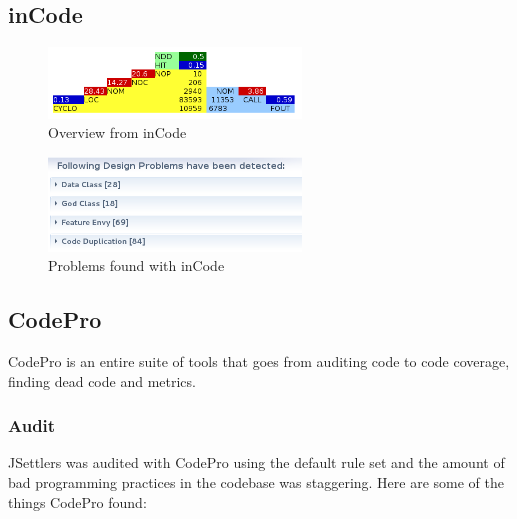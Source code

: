 \documentclass[pdftex12pt, a4paper]{article}
\begin{document}
\subsection{inCode}

\begin{figure}
\begin{center}
\includegraphics[width=0.6\textwidth]{Image/Incode/overview.png}
\caption{Overview from inCode}
\label{fig:incodeTriangle}
\end{center}
\end{figure}

\begin{figure}
\begin{center}
\includegraphics[width=0.6\textwidth]{Image/Incode/problems.png}
\caption{Problems found with inCode}
\label{fig:incodeTriangle}
\end{center}
\end{figure}

\subsection{CodePro}

CodePro is an entire suite of tools that goes from auditing code to code coverage, finding dead code and metrics.

\subsubsection{Audit}

JSettlers was audited with CodePro using the default rule set and the amount of bad programming practices in the codebase was staggering. Here are some of the things CodePro found:
\end{document}
